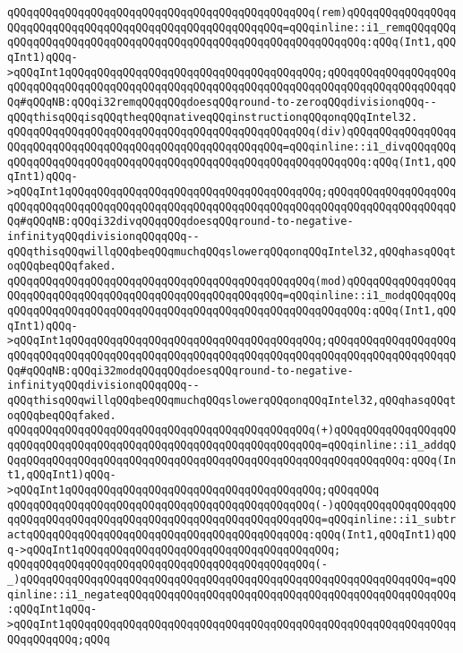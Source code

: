 \verb|qQQqqQQqqQQqqQQqqQQqqQQqqQQqqQQqqQQqqQQqqQQqqQQq(rem)qQQqqQQqqQQqqQQqqQQqqQQqqQQqqQQqqQQqqQQqqQQqqQQqqQQqqQQqqQQq=qQQqinline::i1_remqQQqqQQqqQQqqQQqqQQqqQQqqQQqqQQqqQQqqQQqqQQqqQQqqQQqqQQqqQQqqQQq:qQQq(Int1,qQQqInt1)qQQq->qQQqInt1qQQqqQQqqQQqqQQqqQQqqQQqqQQqqQQqqQQqqQQq;qQQqqQQqqQQqqQQqqQQqqQQqqQQqqQQqqQQqqQQqqQQqqQQqqQQqqQQqqQQqqQQqqQQqqQQqqQQqqQQqqQQqqQQqqQQq#qQQqNB:qQQqi32remqQQqqQQqdoesqQQqround-to-zeroqQQqdivisionqQQq--qQQqthisqQQqisqQQqtheqQQqnativeqQQqinstructionqQQqonqQQqIntel32.|\newline
\verb|qQQqqQQqqQQqqQQqqQQqqQQqqQQqqQQqqQQqqQQqqQQqqQQq(div)qQQqqQQqqQQqqQQqqQQqqQQqqQQqqQQqqQQqqQQqqQQqqQQqqQQqqQQqqQQq=qQQqinline::i1_divqQQqqQQqqQQqqQQqqQQqqQQqqQQqqQQqqQQqqQQqqQQqqQQqqQQqqQQqqQQqqQQq:qQQq(Int1,qQQqInt1)qQQq->qQQqInt1qQQqqQQqqQQqqQQqqQQqqQQqqQQqqQQqqQQqqQQq;qQQqqQQqqQQqqQQqqQQqqQQqqQQqqQQqqQQqqQQqqQQqqQQqqQQqqQQqqQQqqQQqqQQqqQQqqQQqqQQqqQQqqQQqqQQq#qQQqNB:qQQqi32divqQQqqQQqdoesqQQqround-to-negative-infinityqQQqdivisionqQQqqQQq--qQQqthisqQQqwillqQQqbeqQQqmuchqQQqslowerqQQqonqQQqIntel32,qQQqhasqQQqtoqQQqbeqQQqfaked.|\newline
\verb|qQQqqQQqqQQqqQQqqQQqqQQqqQQqqQQqqQQqqQQqqQQqqQQq(mod)qQQqqQQqqQQqqQQqqQQqqQQqqQQqqQQqqQQqqQQqqQQqqQQqqQQqqQQqqQQq=qQQqinline::i1_modqQQqqQQqqQQqqQQqqQQqqQQqqQQqqQQqqQQqqQQqqQQqqQQqqQQqqQQqqQQqqQQq:qQQq(Int1,qQQqInt1)qQQq->qQQqInt1qQQqqQQqqQQqqQQqqQQqqQQqqQQqqQQqqQQqqQQq;qQQqqQQqqQQqqQQqqQQqqQQqqQQqqQQqqQQqqQQqqQQqqQQqqQQqqQQqqQQqqQQqqQQqqQQqqQQqqQQqqQQqqQQqqQQq#qQQqNB:qQQqi32modqQQqqQQqdoesqQQqround-to-negative-infinityqQQqdivisionqQQqqQQq--qQQqthisqQQqwillqQQqbeqQQqmuchqQQqslowerqQQqonqQQqIntel32,qQQqhasqQQqtoqQQqbeqQQqfaked.|\newline
\verb|qQQqqQQqqQQqqQQqqQQqqQQqqQQqqQQqqQQqqQQqqQQqqQQq(+)qQQqqQQqqQQqqQQqqQQqqQQqqQQqqQQqqQQqqQQqqQQqqQQqqQQqqQQqqQQqqQQqqQQq=qQQqinline::i1_addqQQqqQQqqQQqqQQqqQQqqQQqqQQqqQQqqQQqqQQqqQQqqQQqqQQqqQQqqQQqqQQq:qQQq(Int1,qQQqInt1)qQQq->qQQqInt1qQQqqQQqqQQqqQQqqQQqqQQqqQQqqQQqqQQqqQQq;qQQqqQQq|\newline
\verb|qQQqqQQqqQQqqQQqqQQqqQQqqQQqqQQqqQQqqQQqqQQqqQQq(-)qQQqqQQqqQQqqQQqqQQqqQQqqQQqqQQqqQQqqQQqqQQqqQQqqQQqqQQqqQQqqQQqqQQq=qQQqinline::i1_subtractqQQqqQQqqQQqqQQqqQQqqQQqqQQqqQQqqQQqqQQqqQQq:qQQq(Int1,qQQqInt1)qQQq->qQQqInt1qQQqqQQqqQQqqQQqqQQqqQQqqQQqqQQqqQQqqQQq;|\newline
\verb|qQQqqQQqqQQqqQQqqQQqqQQqqQQqqQQqqQQqqQQqqQQqqQQq(-_)qQQqqQQqqQQqqQQqqQQqqQQqqQQqqQQqqQQqqQQqqQQqqQQqqQQqqQQqqQQqqQQq=qQQqinline::i1_negateqQQqqQQqqQQqqQQqqQQqqQQqqQQqqQQqqQQqqQQqqQQqqQQqqQQq:qQQqInt1qQQq->qQQqInt1qQQqqQQqqQQqqQQqqQQqqQQqqQQqqQQqqQQqqQQqqQQqqQQqqQQqqQQqqQQqqQQqqQQqqQQq;qQQq|\newline

